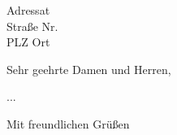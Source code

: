 \documentclass[
	fsphys,
	a4paper,
	12pt,
	ngerman
]{scrlttr2}
\begin{document}
\begin{letter}{Adressat\\Straße Nr.\\PLZ Ort}

\opening{Sehr geehrte Damen und Herren,}

...

\closing{Mit freundlichen Grüßen}




\end{letter}
\end{document}
